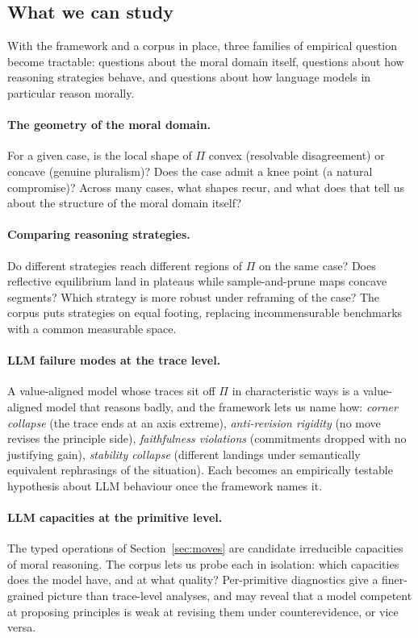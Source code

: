 \documentclass{article}
\begin{document}
\subsection{What we can study}
\label{sec:study}

With the framework and a corpus in place, three families of empirical
question become tractable: questions about the moral domain itself,
questions about how reasoning strategies behave, and questions about how
language models in particular reason morally.

\paragraph{The geometry of the moral domain.} For a given case, is the
local shape of $\Pi$ convex (resolvable disagreement) or concave (genuine
pluralism)? Does the case admit a knee point (a natural compromise)?
Across many cases, what shapes recur, and what does that tell us about
the structure of the moral domain itself?

\paragraph{Comparing reasoning strategies.} Do different strategies reach
different regions of $\Pi$ on the same case? Does reflective equilibrium
land in plateaus while sample-and-prune maps concave segments? Which
strategy is more robust under reframing of the case? The corpus puts
strategies on equal footing, replacing incommensurable benchmarks with a
common measurable space.

\paragraph{LLM failure modes at the trace level.} A value-aligned model
whose traces sit off $\Pi$ in characteristic ways is a value-aligned
model that reasons badly, and the framework lets us name how:
\emph{corner collapse} (the trace ends at an axis extreme),
\emph{anti-revision rigidity} (no move revises the principle side),
\emph{faithfulness violations} (commitments dropped with no justifying
gain), \emph{stability collapse} (different landings under semantically
equivalent rephrasings of the situation). Each becomes an empirically
testable hypothesis about LLM behaviour once the framework names it.

\paragraph{LLM capacities at the primitive level.} The typed operations of
Section~\ref{sec:moves} are candidate irreducible capacities of moral
reasoning. The corpus lets us probe each in isolation: which capacities
does the model have, and at what quality? Per-primitive diagnostics give
a finer-grained picture than trace-level analyses, and may reveal that a
model competent at proposing principles is weak at revising them under
counterevidence, or vice versa.
\end{document}
